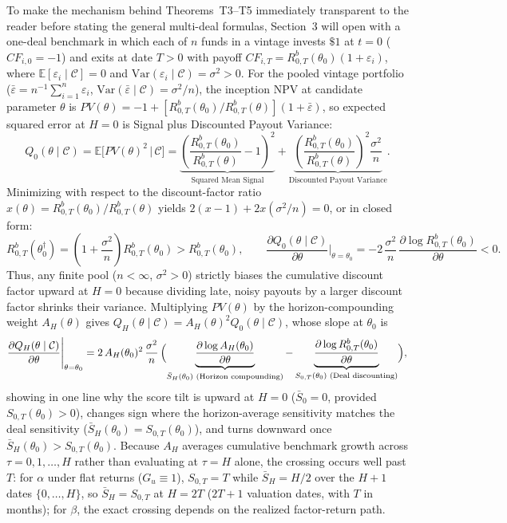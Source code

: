 \documentclass[11pt]{article}
\newcommand{\E}{\mathbb{E}}
\newcommand{\Var}{\mathrm{Var}}
\newcommand{\C}{\mathcal{C}}
\begin{document}
To make the mechanism behind Theorems~T3--T5 immediately transparent to the reader before stating the general multi-deal formulas, Section~3 will open with a one-deal benchmark in which each of $n$ funds in a vintage invests $\$1$ at $t=0$ ($CF_{i,0}=-1$) and exits at date $T>0$ with payoff $CF_{i,T}=R^b_{0,T}(\theta_0)(1+\varepsilon_i)$, where $\E[\varepsilon_i\mid\C]=0$ and $\Var(\varepsilon_i\mid\C)=\sigma^2>0$. For the pooled vintage portfolio ($\bar\varepsilon=n^{-1}\sum_{i=1}^n\varepsilon_i$, $\Var(\bar\varepsilon\mid\C)=\sigma^2/n$), the inception NPV at candidate parameter $\theta$ is $PV(\theta)=-1+[R^b_{0,T}(\theta_0)/R^b_{0,T}(\theta)](1+\bar\varepsilon)$, so expected squared error at $H=0$ is Signal plus Discounted Payout Variance:
\[
Q_0(\theta\mid\C)=\E\bigl[PV(\theta)^2\,\big|\,\C\bigr]=\underbrace{\left(\frac{R^b_{0,T}(\theta_0)}{R^b_{0,T}(\theta)}-1\right)^2}_{\text{Squared Mean Signal}}+\underbrace{\left(\frac{R^b_{0,T}(\theta_0)}{R^b_{0,T}(\theta)}\right)^2\frac{\sigma^2}{n}}_{\text{Discounted Payout Variance}}.
\]
Minimizing with respect to the discount-factor ratio $x(\theta)=R^b_{0,T}(\theta_0)/R^b_{0,T}(\theta)$ yields $2(x-1)+2x(\sigma^2/n)=0$, or in closed form:
\[
R^b_{0,T}(\theta_0^\dagger)=\left(1+\frac{\sigma^2}{n}\right)R^b_{0,T}(\theta_0)>R^b_{0,T}(\theta_0),\qquad
\frac{\partial Q_0(\theta\mid\C)}{\partial\theta}\Bigg|_{\theta=\theta_0}=-2\,\frac{\sigma^2}{n}\,\frac{\partial\log R^b_{0,T}(\theta_0)}{\partial\theta}<0.
\]
Thus, any finite pool ($n<\infty$, $\sigma^2>0$) strictly biases the cumulative discount factor upward at $H=0$ because dividing late, noisy payouts by a larger discount factor shrinks their variance. Multiplying $PV(\theta)$ by the horizon-compounding weight $A_H(\theta)$ gives $Q_H(\theta\mid\C)=A_H(\theta)^2 Q_0(\theta\mid\C)$, whose slope at $\theta_0$ is
\[
\frac{\partial Q_H(\theta\mid\C)}{\partial\theta}\Bigg|_{\theta=\theta_0}=2\,A_H(\theta_0)^2\,\frac{\sigma^2}{n}\,\Bigl(\underbrace{\frac{\partial\log A_H(\theta_0)}{\partial\theta}}_{\bar S_H(\theta_0)\text{ (Horizon compounding)}}-\underbrace{\frac{\partial\log R^b_{0,T}(\theta_0)}{\partial\theta}}_{S_{0,T}(\theta_0)\text{ (Deal discounting)}}\Bigr),
\]
showing in one line why the score tilt is upward at $H=0$ ($\bar S_0=0$, provided $S_{0,T}(\theta_0)>0$), changes sign where the horizon-average sensitivity matches the deal sensitivity ($\bar S_H(\theta_0)=S_{0,T}(\theta_0)$), and turns downward once $\bar S_H(\theta_0)>S_{0,T}(\theta_0)$. Because $A_H$ averages cumulative benchmark growth across $\tau=0,1,\dots,H$ rather than evaluating at $\tau=H$ alone, the crossing occurs well past $T$: for $\alpha$ under flat returns ($G_u\equiv 1$), $S_{0,T}=T$ while $\bar S_H=H/2$ over the $H+1$ dates $\{0,\dots,H\}$, so $\bar S_H=S_{0,T}$ at $H=2T$ ($2T+1$ valuation dates, with $T$ in months); for $\beta$, the exact crossing depends on the realized factor-return path.
\end{document}
